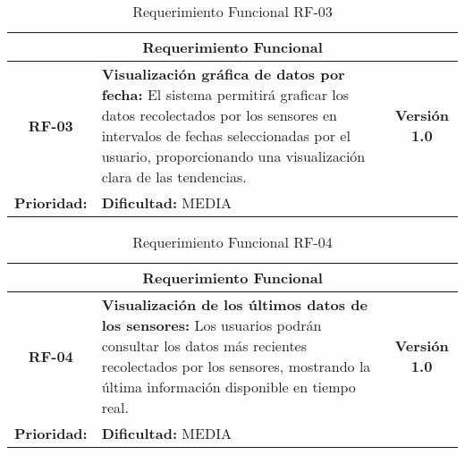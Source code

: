 \begin{table}[h]
\centering
\begin{tabular}{|c|p{10cm}|c|}
\hline
\multicolumn{3}{|c|}{\textbf{Requerimiento Funcional}} \\ \hline
\textbf{RF-03} & \textbf{Visualización gráfica de datos por fecha:} El sistema permitirá graficar los datos recolectados por los sensores en intervalos de fechas seleccionadas por el usuario, proporcionando una visualización clara de las tendencias. & \textbf{Versión 1.0} \\ \hline
\multicolumn{1}{|l|}{\textbf{Prioridad:}} MEDIA & \multicolumn{2}{l|}{\textbf{Dificultad:} MEDIA} \\ \hline
\end{tabular}
\caption{Requerimiento Funcional RF-03}
\end{table}
\vspace{1cm} %

\begin{table}[h]
\centering
\begin{tabular}{|c|p{10cm}|c|}
\hline
\multicolumn{3}{|c|}{\textbf{Requerimiento Funcional}} \\ \hline
\textbf{RF-04} & \textbf{Visualización de los últimos datos de los sensores:} Los usuarios podrán consultar los datos más recientes recolectados por los sensores, mostrando la última información disponible en tiempo real. & \textbf{Versión 1.0} \\ \hline
\multicolumn{1}{|l|}{\textbf{Prioridad:}} MEDIA & \multicolumn{2}{l|}{\textbf{Dificultad:} MEDIA} \\ \hline
\end{tabular}
\caption{Requerimiento Funcional RF-04}
\end{table}
\vspace{1cm} %

